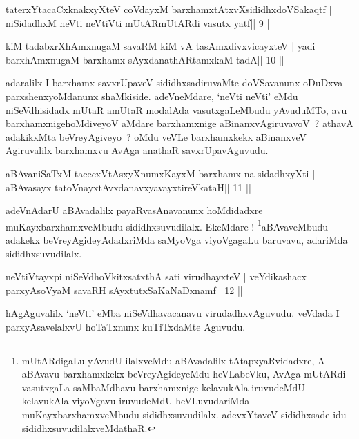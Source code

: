 
\begin{shl}
taterxYtacaCxknakxyXteV coVdayxM barxhamxtAtxvXsididhxdoVSakaqtf |
niSidadhxM neVti neVtiVti mUtARmUtARdi vasutx yatf\hfill || 9 ||
\end{shl}

\begin{shl}
kiM tadabxrXhAmxnugaM savaRM kiM vA tasAmxdivxvicayxteV |
yadi barxhAmxnugaM barxhamx sAyxdanathARtamxkaM tadA\hfill || 10 ||
\end{shl}

\begin{artha}
adaralilx I barxhamx savxrUpaveV sididhxsadiruvaMte doVSavanunx
oDuDxva parxshenxyoMdanunx shaMkiside. adeVneMdare, `neVti neVti' eMdu
niSeVdhisidadx mUtaR amUtaR modalAda vasutxgaLeMbudu yAvuduMTo, avu
barxhamxnige\break hoMdiveyoV aMdare barxhamxnige aBinanxvAgiruvavoV~?
athavA adakikxMta beVreyAgiveyo~? oMdu veVLe barxhamxkekx aBinanxveV
Agiruvalilx barxhamxvu AvAga anathaR savxrUpavAguvudu. 
\end{artha}

\begin{shl}
aBAvaniSaTxM tacecxVtAsxyXnumxKayxM barxhamx na sidadhxyXti |
aBAvasayx tatoV\s nayxtAvxdanavxyavayxtireVkataH\hfill || 11 ||
\end{shl}

\begin{artha}
adeVnAdarU aBAvadalilx payaRvasAnavanunx hoMdidadxre
muKayxbarxhamxveMbudu sididhxsuvudilalx. EkeMdare
! \footnote{mUtARdigaLu yAvudU ilalxveMdu aBAvadalilx
 tAtapxyaRvidadxre, A aBAvavu barxhamxkekx beVreyAgideyeMdu
 heVLabeVku, AvAga mUtARdi vasutxgaLa saMbaMdhavu barxhamxnige
 kelavukAla iruvudeMdU kelavukAla viyoVgavu iruvudeMdU heVLuvudariMda
 muKayxbarxhamxveMbudu sididhxsuvudilalx. adevxYtaveV sididhxsade idu
 sididhxsuvudilalxveMdathaR.}aBAvaveMbudu adakekx beVreyAgideyAdadxriMda saMyoVga
viyoVgagaLu baruvavu, adariMda sididhxsuvudilalx.
\end{artha}

\begin{shl}
neVtiVtayxpi niSeVdhoVkitxsatxthA sati virudhayxteV |
veYdikashacx parxyAsoV\s yaM savaRH sAyxtutxSaKaNaDxnamf\hfill || 12 ||
\end{shl}

\begin{artha}
hAgAguvalilx `neVti' eMba niSeVdhavacanavu virudadhxvAguvudu. veVdada I parxyAsavelalxvU hoTaTxnunx kuTiTxdaMte Aguvudu.
\end{artha}

